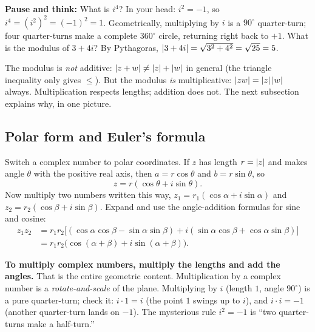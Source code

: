 \begin{recoverybox}
\textbf{Pause and think:} What is $i^4$? In your head: $i^2 = -1$, so $i^4 = (i^2)^2 = (-1)^2 = 1$.
Geometrically, multiplying by $i$ is a $90^\circ$ quarter-turn; four quarter-turns make a complete
$360^\circ$ circle, returning right back to $+1$. What is the modulus of $3 + 4i$? By Pythagoras,
$\lvert3+4i\rvert = \sqrt{3^2 + 4^2} = \sqrt{25} = 5$.
\end{recoverybox}

\begin{trapbox}
The modulus is \emph{not} additive: $\lvert z+w\rvert \ne \lvert z\rvert + \lvert w\rvert$ in general (the triangle
inequality only gives $\le$). But the modulus \emph{is} multiplicative: $\lvert zw\rvert = \lvert z\rvert\,\lvert w\rvert$
always. Multiplication respects lengths; addition does not. The next subsection explains why, in one
picture.
\end{trapbox}

\subsection{Polar form and Euler's formula}
\label{ch39:euler}

Switch a complex number to polar coordinates. If $z$ has length $r = \lvert z\rvert$ and makes angle
$\theta$ with the positive real axis, then $a = r\cos\theta$ and $b = r\sin\theta$, so
\[
z = r(\cos\theta + i\sin\theta).
\]
Now multiply two numbers written this way, $z_1 = r_1(\cos\alpha + i\sin\alpha)$ and $z_2 =
r_2(\cos\beta + i\sin\beta)$. Expand and use the angle-addition formulas for sine and cosine:
\begin{align*}
z_1 z_2 &= r_1 r_2\bigl[(\cos\alpha\cos\beta - \sin\alpha\sin\beta) + i(\sin\alpha\cos\beta +
\cos\alpha\sin\beta)\bigr] \\
&= r_1 r_2\bigl(\cos(\alpha+\beta) + i\sin(\alpha+\beta)\bigr).
\end{align*}

\begin{intuitionbox}
\textbf{To multiply complex numbers, multiply the lengths and add the angles.} That is the entire
geometric content. Multiplication by a complex number is a \emph{rotate-and-scale} of the plane.
Multiplying by $i$ (length $1$, angle $90^\circ$) is a pure quarter-turn; check it: $i\cdot 1 = i$
(the point $1$ swings up to $i$), and $i\cdot i = -1$ (another quarter-turn lands on $-1$). The
mysterious rule $i^2 = -1$ is ``two quarter-turns make a half-turn.''
\end{intuitionbox}

